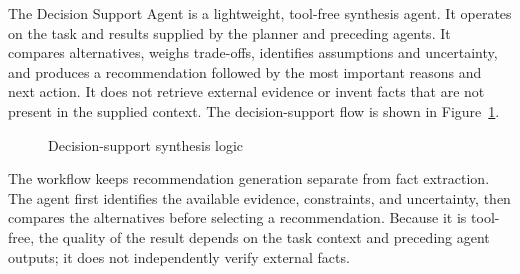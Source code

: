 The Decision Support Agent is a lightweight, tool-free synthesis agent. It
operates on the task and results supplied by the planner and preceding agents.
It compares alternatives, weighs trade-offs, identifies assumptions and
uncertainty, and produces a recommendation followed by the most important
reasons and next action. It does not retrieve external evidence or invent
facts that are not present in the supplied context.
The decision-support flow is shown in Figure~\ref{fig:decision-support-logic}.
\begin{figure}[H]\centering
{}
\caption{Decision-support synthesis logic}
\label{fig:decision-support-logic}
\end{figure}
The workflow keeps recommendation generation separate from fact extraction. The agent first identifies the available evidence, constraints, and uncertainty, then compares the alternatives before selecting a recommendation. Because it is tool-free, the quality of the result depends on the task context and preceding agent outputs; it does not independently verify external facts.

\clearpage
{}

